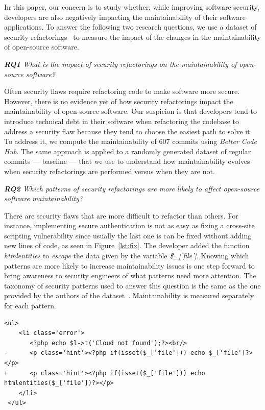 \documentclass[10pt,conference]{IEEEtran}
\newcounter{lstannotation}
\begin{document}
In this paper, our concern is to study whether, while improving software
security, developers are also negatively impacting the maintainability of their
software applications. To answer the following two research questions, we use a
dataset of security refactorings~\cite{Reis:2017:IJSSE} to measure the impact of
the changes in the maintainability of open-source software.

\begin{framed}
\textit{\textbf{RQ1} What is the impact of security refactorings on the
maintainability of open-source software?}
\end{framed}

Often security flaws require refactoring code to make software more secure.
However, there is no evidence yet of how security refactorings impact the
maintainability of open-source software. Our suspicion is that developers tend
to introduce technical debt in their software when refactoring the codebase to
address a security flaw because they tend to choose the easiest path to solve
it. To address it, we compute the maintainability of $607$ commits using
\emph{Better Code Hub}. The same approach is applied to a randomly generated
dataset of regular commits --- baseline --- that we use to understand how
maintainability evolves when security refactorings are performed versus when
they are not.

\begin{framed}
\textit{\textbf{RQ2} Which patterns of security refactorings are more likely to
affect open-source software maintainability?}
\end{framed}

There are security flaws that are more difficult to refactor than others. For
instance, implementing secure authentication is not as easy as fixing a
cross-site scripting vulnerability since usually the last one is can be fixed
without adding new lines of code, as seen in Figure~\ref{lst:fix}. The developer
added the function \emph{htmlentities} to \textit{escape} the data given by the
variable \emph{\$\_['file']}. Knowing which patterns are more likely to increase
maintainability issues is one step forward to bring awareness to security
engineers of what patterns need more attention. The taxonomy of security
patterns used to answer this question is the same as the one provided by the
authors of the dataset~\cite{Reis:2017:IJSSE}. Maintainability is measured
separately for each pattern.

\setcounter{lstannotation}{0}
\begin{lstlisting}[style={PHPStyle}, caption={Fix provided by \texttt{nextcloud/server} developers to a \\Cross-Site Scripting vulnerability},label={lst:fix}]
 <ul>
    <li class='error'>
       <?php echo $l->t('Cloud not found');?><br/>
-      <p class='hint'><?php if(isset($_['file'])) echo $_['file']?></p>
+      <p class='hint'><?php if(isset($_['file'])) echo htmlentities($_['file'])?></p>
    </li>
 </ul>

\end{lstlisting}
%
\end{document}
